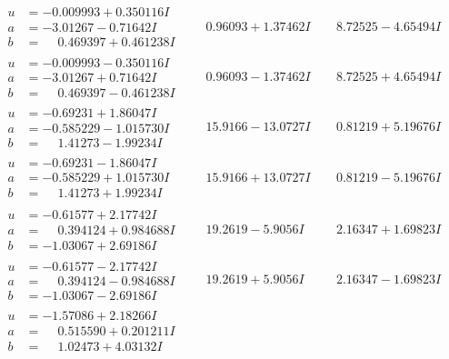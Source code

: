 \documentclass[1p]{elsarticle_modified}
\theoremstyle{definition}
\begin{document}
$$\begin{array}{c|c|c}
\begin{aligned}
u &= -0.009993 + 0.350116 I \\
a &= -3.01267 - 0.71642 I \\
b &= \phantom{-}0.469397 + 0.461238 I\end{aligned}
 & \phantom{-}0.96093 + 1.37462 I & \phantom{-}8.72525 - 4.65494 I \\ \hline\begin{aligned}
u &= -0.009993 - 0.350116 I \\
a &= -3.01267 + 0.71642 I \\
b &= \phantom{-}0.469397 - 0.461238 I\end{aligned}
 & \phantom{-}0.96093 - 1.37462 I & \phantom{-}8.72525 + 4.65494 I \\ \hline\begin{aligned}
u &= -0.69231 + 1.86047 I \\
a &= -0.585229 - 1.015730 I \\
b &= \phantom{-}1.41273 - 1.99234 I\end{aligned}
 & \phantom{-}15.9166 - 13.0727 I & \phantom{-}0.81219 + 5.19676 I \\ \hline\begin{aligned}
u &= -0.69231 - 1.86047 I \\
a &= -0.585229 + 1.015730 I \\
b &= \phantom{-}1.41273 + 1.99234 I\end{aligned}
 & \phantom{-}15.9166 + 13.0727 I & \phantom{-}0.81219 - 5.19676 I \\ \hline\begin{aligned}
u &= -0.61577 + 2.17742 I \\
a &= \phantom{-}0.394124 + 0.984688 I \\
b &= -1.03067 + 2.69186 I\end{aligned}
 & \phantom{-}19.2619 - 5.9056 I & \phantom{-}2.16347 + 1.69823 I \\ \hline\begin{aligned}
u &= -0.61577 - 2.17742 I \\
a &= \phantom{-}0.394124 - 0.984688 I \\
b &= -1.03067 - 2.69186 I\end{aligned}
 & \phantom{-}19.2619 + 5.9056 I & \phantom{-}2.16347 - 1.69823 I \\ \hline\begin{aligned}
u &= -1.57086 + 2.18266 I \\
a &= \phantom{-}0.515590 + 0.201211 I \\
b &= \phantom{-}1.02473 + 4.03132 I\end{aligned}

\end{array}$$
\end{document}
